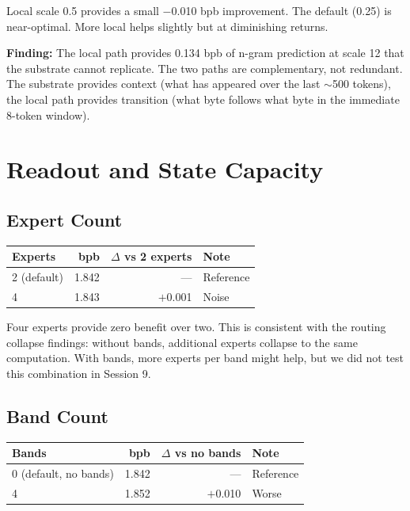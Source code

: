 \documentclass[11pt,a4paper]{report}
\newcommand{\finding}[1]{\textcolor{finding}{\textbf{Finding:}} #1}
\begin{document}
Local scale 0.5 provides a small $-$0.010 bpb improvement. The default (0.25) is near-optimal. More local helps slightly but at diminishing returns.

\finding{The local path provides 0.134 bpb of n-gram prediction at scale 12 that the substrate cannot replicate.} The two paths are complementary, not redundant. The substrate provides context (what has appeared over the last $\sim$500 tokens), the local path provides transition (what byte follows what byte in the immediate 8-token window).


\chapter{Readout and State Capacity}

\section{Expert Count}

\begin{center}
\begin{tabular}{lrrl}
\toprule
Experts & bpb & $\Delta$ vs 2 experts & Note \\
\midrule
2 (default) & 1.842 & --- & Reference \\
4 & 1.843 & $+$0.001 & Noise \\
\bottomrule
\end{tabular}
\end{center}

Four experts provide zero benefit over two. This is consistent with the routing collapse findings: without bands, additional experts collapse to the same computation. With bands, more experts per band might help, but we did not test this combination in Session 9.

\section{Band Count}

\begin{center}
\begin{tabular}{lrrl}
\toprule
Bands & bpb & $\Delta$ vs no bands & Note \\
\midrule
0 (default, no bands) & 1.842 & --- & Reference \\
4 & 1.852 & $+$0.010 & Worse \\
\bottomrule
\end{tabular}
\end{center}
\end{document}
